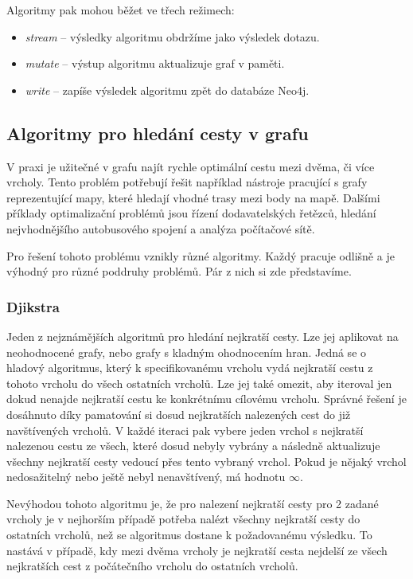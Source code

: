 \documentclass[
  program=infoi,
  biblatex=true,
  sourcecodes=true,
  figures=true,
  glossaries=false,
  index
]{kidiplom}
\begin{document}
Algoritmy pak mohou běžet ve třech režimech:
\begin{itemize}
\item \textit{stream} -- výsledky algoritmu obdržíme jako výsledek dotazu.
\item \textit{mutate} -- výstup algoritmu aktualizuje graf v paměti.
\item \textit{write} -- zapíše výsledek algoritmu zpět do databáze Neo4j.
\end{itemize}

\subsection{Algoritmy pro hledání cesty v grafu}
V praxi je užitečné v grafu najít rychle optimální cestu mezi dvěma, či více vrcholy. Tento problém potřebují řešit například nástroje pracující s grafy reprezentující mapy, které hledají vhodné trasy mezi body na mapě. Dalšími příklady optimalizační problémů jsou řízení dodavatelských řetězců, hledání nejvhodnějšího autobusového spojení a analýza počítačové sítě. 

Pro řešení tohoto problému vznikly různé algoritmy. Každý pracuje odlišně a je výhodný pro různé poddruhy problémů. Pár z nich si zde představíme.

\subsubsection{Djikstra}
Jeden z nejznámějších algoritmů pro hledání nejkratší cesty. Lze jej aplikovat na neohodnocené grafy, nebo grafy s kladným ohodnocením hran. Jedná se o hladový algoritmus, který k specifikovanému vrcholu vydá nejkratší cestu z tohoto vrcholu do všech ostatních vrcholů. Lze jej také omezit, aby iteroval jen dokud nenajde nejkratší cestu ke konkrétnímu cílovému vrcholu. Správné řešení je dosáhnuto díky pamatování si dosud nejkratších nalezených cest do již navštívených vrcholů. V každé iteraci pak vybere jeden vrchol s nejkratší nalezenou cestu ze všech, které dosud nebyly vybrány a následně aktualizuje všechny nejkratší cesty vedoucí přes tento vybraný vrchol. Pokud je nějaký vrchol nedosažitelný nebo ještě nebyl nenavštívený, má hodnotu $\infty$.

Nevýhodou tohoto algoritmu je, že pro nalezení nejkratší cesty pro 2 zadané vrcholy je v nejhorším případě potřeba nalézt všechny nejkratší cesty do ostatních vrcholů, než se algoritmus dostane k požadovanému výsledku. To nastává v případě, kdy mezi dvěma vrcholy je nejkratší cesta nejdelší ze všech nejkratších cest z počátečního vrcholu do ostatních vrcholů.
\end{document}

